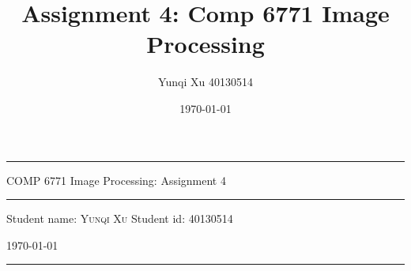 \documentclass[12pt]{article}
\title{Assignment 4: Comp 6771 Image Processing}
\author{Yunqi Xu 40130514}
\date{\today}
\begin{document}

\begin{titlepage}
  \rule{\textwidth}{1pt}   %
    \vspace{0.2\textheight}  %


    {\Huge COMP 6771 Image Processing: Assignment 4}

    \vspace{0.025\textheight}   %

    \rule{0.83\textwidth}{0.4pt}  %

    \vspace{0.1\textheight}  %


    {\Large Student name: \textsc{Yunqi Xu}}
    \vfill
    {\Large Student id: 40130514}
    \vfill  %

    {\large \today}
    \vspace{0.1\textheight}  %


    \rule{\textwidth}{1pt}  %
\end{titlepage}
\end{document}
